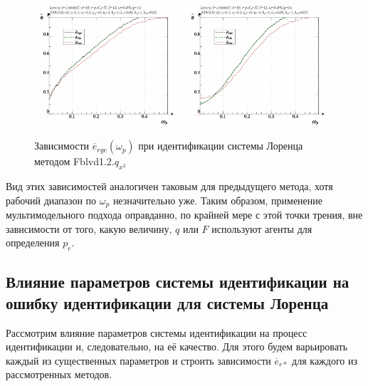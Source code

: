 \begin{figure}[ht!]
  \centerline{
    \includegraphics[width=0.49\textwidth]{p/cha/lor/Fq3zlovnAAF/lor_Fq3zlovnAAF_qx2-p_omega_p_e_sign.png}
    \hfill
    \includegraphics[width=0.49\textwidth]{p/cha/lor/Fq3zlovnAAF/lor_Fq3zlovnAAF_qx2-p_omega_p_e_sin.png}
  }
  \caption{Зависимости $\overline{e}_{rge}(\omega_p)$ при идентификации системы Лоренца методом Fblvd1.2.$q_{x^2}$}
  \label{atu:f:lor_Fq3zlovnAAF_e_omega_p}
\end{figure}

Вид этих зависимостей аналогичен таковым для предыдущего метода,
хотя рабочий диапазон по $\omega_p$ незначительно уже.
Таким образом, применение мультимодельного подхода
оправданно, по крайней мере с этой точки трения,
вне зависимости от того, какую величину, $q$ или $F$
используют агенты для определения $p_e$.




\subsection{Влияние параметров системы идентификации на ошибку идентификации для системы Лоренца}  %

Рассмотрим влияние параметров системы идентификации на
процесс идентификации и, следовательно, на её качество.
Для этого будем варьировать каждый из существенных
параметров и строить зависимости $\overline{e}_{r*}$
для каждого из рассмотренных методов.


